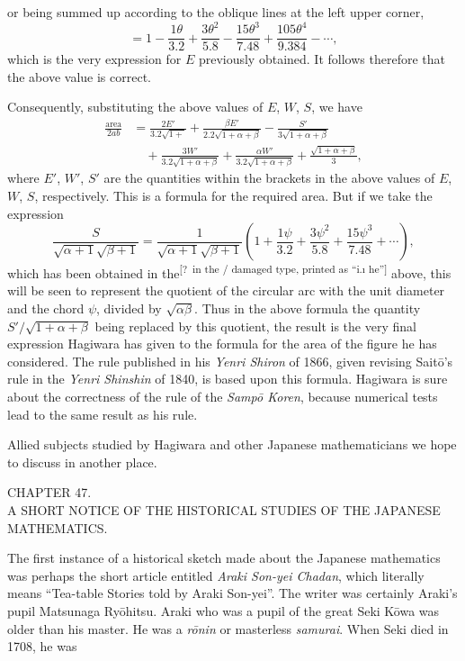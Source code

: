 \documentclass[11pt]{article}
\newcommand{\scanpage}[2]{\clearpage\setcounter{footnote}{0}\noindent{\footnotesize\color{gray}PDF page #1 · #2}\par\medskip}
\newcommand{\unclear}[1]{\textsuperscript{[?~#1]}}
\begin{document}
\scanpage{0336}{printed page 322}
or being summed up according to the oblique lines at the left upper corner,
\[
=1-\frac{1\theta}{3.2}+\frac{3\theta^2}{5.8}-\frac{15\theta^3}{7.48}+\frac{105\theta^4}{9.384}-\cdots,
\]
which is the very expression for $E$ previously obtained. It follows therefore that the above value is correct.

Consequently, substituting the above values of $E$, $W$, $S$, we have
\[
\begin{aligned}
\frac{\text{area}}{2ab}&=\frac{2E'}{3.2\sqrt{1+}}+\frac{\beta E'}{2.2\sqrt{1+\alpha+\beta}}-\frac{S'}{3\sqrt{1+\alpha+\beta}}\\
&\quad+\frac{3W'}{3.2\sqrt{1+\alpha+\beta}}+\frac{\alpha W'}{3.2\sqrt{1+\alpha+\beta}}+\frac{\sqrt{1+\alpha+\beta}}{3},
\end{aligned}
\]
where $E'$, $W'$, $S'$ are the quantities within the brackets in the above values of $E$, $W$, $S$, respectively. This is a formula for the required area. But if we take the expression
\[
\frac{S}{\sqrt{\alpha+1}\sqrt{\beta+1}}=\frac{1}{\sqrt{\alpha+1}\sqrt{\beta+1}}\left(1+\frac{1\psi}{3.2}+\frac{3\psi^2}{5.8}+\frac{15\psi^3}{7.48}+\cdots\right),
\]
which has been obtained in the\unclear{in the / damaged type, printed as ``i.ı he''} above, this will be seen to represent the quotient of the circular arc with the unit diameter and the chord $\psi$, divided by $\sqrt{\alpha\beta}$. Thus in the above formula the quantity $S'/\sqrt{1+\alpha+\beta}$ being replaced by this quotient, the result is the very final expression Hagiwara has given to the formula for the area of the figure he has considered. The rule published in his \emph{Yenri Shiron} of 1866, given revising Saitō's rule in the \emph{Yenri Shinshin} of 1840, is based upon this formula. Hagiwara is sure about the correctness of the rule of the \emph{Sampō Koren}, because numerical tests lead to the same result as his rule.

Allied subjects studied by Hagiwara and other Japanese mathematicians we hope to discuss in another place.

\begin{center}
CHAPTER 47.\\[1mm]
A SHORT NOTICE OF THE HISTORICAL STUDIES OF THE JAPANESE MATHEMATICS.
\end{center}

The first instance of a historical sketch made about the Japanese mathematics was perhaps the short article entitled \emph{Araki Son-yei Chadan}, which literally means ``Tea-table Stories told by Araki Son-yei''. The writer was certainly Araki's pupil Matsunaga Ryōhitsu. Araki who was a pupil of the great Seki Kōwa was older than his master. He was a \emph{rōnin} or masterless \emph{samurai}. When Seki died in 1708, he was
\end{document}
